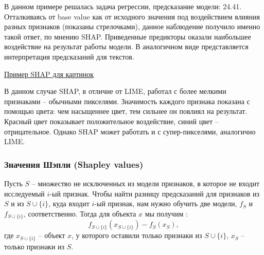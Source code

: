 \vspace{-4mm}
\begin{figure}[h]
\end{figure}
\vspace{-3mm}

В данном примере решалась задача регрессии, предсказание модели: 24.41. Отталкиваясь от base value как от исходного значения под воздействием влияния разных признаков (показаны стрелочками), данное наблюдение получило именно такой ответ, по мнению SHAP. Приведенные предикторы оказали наибольшее воздействие на результат работы модели. В аналогичном виде представляется интерпретация предсказаний для текстов.

\underline{Пример SHAP для картинок} \cite{shapgit}

\vspace{-2mm}
\begin{figure}[h]
\end{figure}
\vspace{-2mm}

В данном случае SHAP, в отличие от LIME, работал с более мелкими признаками -- обычными пикселями. Значимость каждого признака показана с помощью цвета: чем насыщеннее цвет, тем сильнее он повлиял на результат. Красный цвет показывает положительное воздействие, синий цвет -- отрицательное. Однако SHAP может работать и с супер-пикселями, аналогично LIME.

\subsubsection{Значения Шэпли (Shapley values)}
Пусть $S$ -- множество не исключенных из модели признаков, в которое не входит исследуемый $i$-ый признак. Чтобы найти разницу предсказаний для признаков из $S$ и из $S \cup \{i\}$, куда входит $i$-ый признак, нам нужно обучить две модели, $f_S$ и $f_{S \cup \{i\}}$, соответственно. Тогда для объекта $x$ мы получим \cite{basis, shap}:
\[
f_{S \cup \{i\}}(x_{S \cup \{i\}}) - f_S(x_S),
\]
где $x_{S \cup \{i\}}$ -- объект $x$, у которого оставили только признаки из $S \cup \{i\}$, $x_S$ -- только признаки из $S$.

